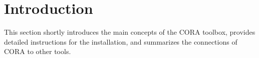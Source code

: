\section{Introduction} \label{sec:introduction}

This section shortly introduces the main concepts of the CORA toolbox, provides detailed instructions for the installation, and summarizes the connections of CORA to other tools.













